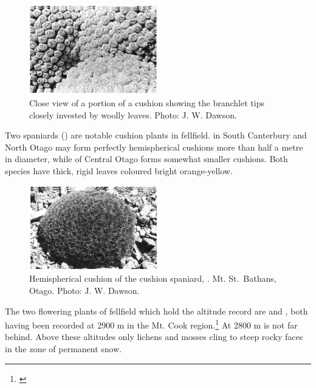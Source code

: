 \begin{figure}
	\includegraphics[width=0.5\textwidth]{graphics/figure109haastia.jpg}
	\centering
	\caption[Close view of a portion of a \emph{Haastia pulvinaris}]{Close view of a portion of a  cushion showing the branchlet tips closely invested by woolly leaves.
	Photo: J. W. Dawson.}%
	\label{fig:109haastia}
\end{figure}

Two spaniards () are notable cushion plants in fellfield.  in South Canterbury and North Otago may form perfectly hemispherical cushions more than half a metre in diameter, while  of Central Otago forms somewhat smaller cushions.
Both species have thick, rigid leaves coloured bright orange-yellow.

\begin{figure}
	\includegraphics[width=0.5\textwidth]{graphics/figure110cushion-spaniard.jpg}
	\centering
	\caption[Hemispherical cushion of the cushion spaniard]{Hemispherical cushion of the cushion spaniard, .
	Mt. St.\ Bathans, Otago.
	Photo: J. W. Dawson.}%
	\label{fig:110cushion-spaniard}
\end{figure}

The two flowering plants of fellfield which hold the altitude record are  and , both having been recorded at 2900 m in the Mt.
Cook region.\footnote{\cite{wilson1978wild}}
At 2800 m  is not far behind.
Above these altitudes only lichens and mosses cling to steep rocky faces in the zone of permanent snow.

